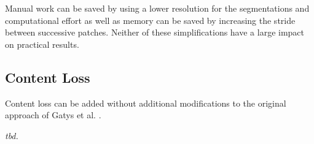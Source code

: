 Manual work can be saved by using a lower resolution for the segmentations and computational effort as well as memory can be saved by increasing the stride between successive patches. Neither of these simplifications have a large impact on practical results.

\subsection{Content Loss}

Content loss can be added without additional modifications to the original approach of Gatys et al. \cite{gatys2015neural}.


\textit{tbd.}

